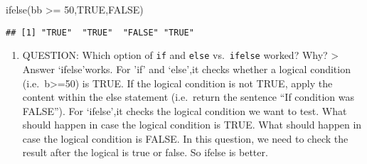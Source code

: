 \documentclass[
]{article}
\newenvironment{Shaded}{\begin{snugshade}}{\end{snugshade}}
\newcommand{\DecValTok}[1]{\textcolor[rgb]{0.00,0.00,0.81}{#1}}
\newcommand{\FunctionTok}[1]{\textcolor[rgb]{0.00,0.00,0.00}{#1}}
\newcommand{\NormalTok}[1]{#1}
\newcommand{\SpecialCharTok}[1]{\textcolor[rgb]{0.00,0.00,0.00}{#1}}
\newcommand{\StringTok}[1]{\textcolor[rgb]{0.31,0.60,0.02}{#1}}
\providecommand{\tightlist}{%
  \setlength{\itemsep}{0pt}\setlength{\parskip}{0pt}}
\begin{document}
\begin{Shaded}
\begin{Highlighting}[]
\FunctionTok{ifelse}\NormalTok{(bb }\SpecialCharTok{\textgreater{}=} \DecValTok{50}\NormalTok{,}\StringTok{\textquotesingle{}TRUE\textquotesingle{}}\NormalTok{,}\StringTok{\textquotesingle{}FALSE\textquotesingle{}}\NormalTok{)}
\end{Highlighting}
\end{Shaded}

\begin{verbatim}
## [1] "TRUE"  "TRUE"  "FALSE" "TRUE"
\end{verbatim}

\begin{enumerate}
\def\labelenumi{\arabic{enumi}.}
\setcounter{enumi}{11}
\tightlist
\item
  QUESTION: Which option of \texttt{if} and \texttt{else}
  vs.~\texttt{ifelse} worked? Why? \textgreater{} Answer `ifelse'works.
  For 'if' and `else',it checks whether a logical condition
  (i.e.~b\textgreater=50) is TRUE. If the logical condition is not TRUE,
  apply the content within the else statement (i.e.~return the sentence
  ``If condition was FALSE''). For `ifelse',it checks the logical
  condition we want to test. What should happen in case the logical
  condition is TRUE. What should happen in case the logical condition is
  FALSE. In this question, we need to check the result after the logical
  is true or false. So ifelse is better.
\end{enumerate}
\end{document}
